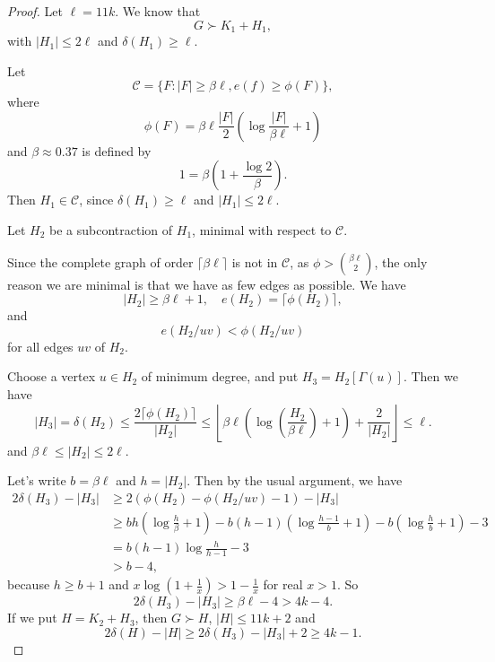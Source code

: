 \documentclass[a4paper]{article}
\begin{document}
\begin{proof}
  Let $\ell = 11k$. We know that
  \[
    G \succ K_1 + H_1,
  \]
  with $|H_1| \leq 2\ell$ and $\delta(H_1) \geq \ell$.

  Let
  \[
    \mathcal{C} = \{F : |F| \geq \beta \ell, e(f) \geq \phi(F)\},
  \]
  where
  \[
    \phi(F) = \beta \ell \frac{|F|}{2} \left( \log \frac{|F|}{\beta \ell} + 1\right)
  \]
  and $\beta \approx 0.37$ is defined by
  \[
    1 = \beta \left(1 + \frac{\log 2}{\beta}\right).
  \]
  Then $H_1 \in \mathcal{C}$, since $\delta(H_1) \geq \ell$ and $|H_1| \leq 2\ell$.

  Let $H_2$ be a subcontraction of $H_1$, minimal with respect to $\mathcal{C}$.

  Since the complete graph of order $\lceil \beta \ell\rceil$ is not in $\mathcal{C}$, as $\phi > \binom{\beta \ell}{2}$, the only reason we are minimal is that we have as few edges as possible. We have
  \[
    |H_2| \geq \beta\ell + 1,\quad e(H_2) = \lceil \phi(H_2)\rceil,
  \]
  and
  \[
    e(H_2/uv) < \phi(H_2/uv)
  \]
  for all edges $uv$ of $H_2$.

  Choose a vertex $u \in H_2$ of minimum degree, and put $H_3 = H_2 [\Gamma(u)]$. Then we have
  \[
    |H_3| = \delta (H_2) \leq \frac{2 \lceil \phi(H_2)\rceil}{|H_2|} \leq \left\lfloor\beta \ell \left(\log \left(\frac{H_2}{\beta \ell}\right) + 1\right)  + \frac{2}{|H_2|}\right\rfloor \leq \ell. %
  \]
  and $\beta \ell \leq |H_2| \leq 2\ell$.

  Let's write $b = \beta \ell$ and $h = |H_2|$. Then by the usual argument, we have
  \begin{align*}
    2 \delta (H_3) - |H_3| &\geq 2 (\phi(H_2) - \phi(H_2/uv) - 1) - |H_3|\\
    &\geq bh \left(\log \frac{h}{\beta} + 1\right) - b (h - 1) \left(\log \frac{h - 1}{b} + 1\right) - b \left(\log \frac{h}{b} + 1\right) - 3\\%
    &= b(h - 1) \log \frac{h}{h - 1} - 3\\
    &> b - 4,
  \end{align*}
  because $h \geq b + 1$ and $x \log \left(1 + \frac{1}{x}\right) > 1 - \frac{1}{x}$ for real $x > 1$. So
  \[
    2 \delta (H_3) - |H_3| \geq \beta \ell - 4 > 4k - 4.
  \]
  If we put $H = K_2 + H_3$, then $G \succ H$, $|H| \leq 11k + 2$ and
  \[
    2\delta (H) - |H| \geq 2 \delta(H_3)  - |H_3| + 2 \geq 4k - 1.
  \]
\end{proof}
\end{document}

